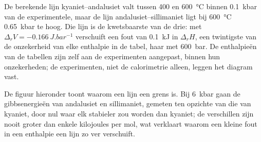 De berekende lijn kyaniet--andalusiet valt tussen 400 en \qty{600}{\celsius} binnen \qty{0.1}{kbar} van de experimentele,
maar de lijn andalusiet--sillimaniet ligt
bij \qty{600}{\celsius} \qty{0.65}{kbar} te hoog. Die lijn is de kwetsbaarste van de
drie: met $\Delta_r V = \qty{-0.166}{J.bar^{-1}}$ verschuift een fout van \qty{0.1}{kJ} in
$\Delta_r H$, een twintigste van de onzekerheid van elke enthalpie in de tabel, haar met
\qty{600}{bar}. De enthalpieën van de tabellen zijn zelf aan de
experimenten aangepast, binnen hun onzekerheden; de experimenten, niet de calorimetrie alleen, leggen het
diagram vast.

De figuur hieronder toont waarom een lijn een grens is. Bij \qty{6}{kbar} gaan de gibbsenergieën van
andalusiet en sillimaniet, gemeten ten opzichte van die van kyaniet, door nul waar elk
stabieler zou worden dan kyaniet; de verschillen zijn nooit groter dan enkele kilojoules per mol,
wat verklaart waarom een kleine fout in een enthalpie een lijn zo ver verschuift.

\begin{omfigure}
\centering
{}
\par{}
\end{omfigure}

